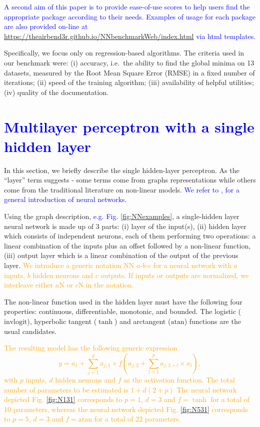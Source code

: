 \textcolor{blue}{A second aim of this paper is to
provide ease-of-use scores to help users find the
appropriate package according to their needs. 
Examples of usage for each package are also provided
on-line at \url{https://theairbend3r.github.io/NNbenchmarkWeb/index.html}
via html templates.}

Specifically, we focus only on regression-based algorithms. The criteria
used in our benchmark were: (i) accuracy, i.e.~the ability to find the
global minima on 13 datasets, measured by the Root Mean Square Error
(RMSE) in a fixed number of iterations; (ii) speed of the training
algorithm; (iii) availability of helpful utilities; (iv) quality of the
documentation.

\hypertarget{section}{%
\section{\texorpdfstring{\textcolor{blue}{Multilayer perceptron with a single hidden layer}}{}}\label{section}}

In this section, we briefly describe the single hidden-layer perceptron.
As the ``layer'' term suggests - some terms come from graphs
representations while others come from the traditional literature on
non-linear models. \textcolor{blue}{
We refer to \citep[Chapter 11]{friedman2001elements}, 
\citep[Chapter 10]{izenman2008modern}
\citep{ripley2007pattern} for a general introduction 
of neural networks.}

Using the graph description,
\textcolor{blue}{e.g. Fig. \ref{fig:NNexamples}}, a single-hidden layer
neural network is made up of 3 parts: (i) layer of the input(s), (ii)
hidden layer which consists of independent neurons, each of them
performing two operations: a linear combination of the inputs plus an
offset followed by a non-linear function, (iii) output layer which is a
linear combination of the output of the previous layer.
\textcolor{orange}{We introduce a generic notation NN $a$-$b$-$c$ for a neural network
with $a$ inputs, $b$ hidden neurons and $c$ outputs. If inputs or outputs
are normalized, we interleave either $a$N or $c$N in the notation.}

The non-linear function used in the hidden layer must have the following
four properties: continuous, differentiable, monotonic, and bounded. The
logistic (\(\text{invlogit}\)), hyperbolic tangent (\(\tanh\)) and
arctangent (\(\text{atan}\)) functions are the usual candidates.

\textcolor{orange}{
The resulting model has the following generic expression 
$$
y = a_1 + \sum_{j=1}^d a_{j,1} \times f(a_{j,2}+\sum_{l=1}^p a_{j,2+l}\times x_l),
$$
with $p$ inputs, $d$ hidden neurons and $f$ as the activation function.
The total number of parameters to be estimated is $1+d(2+p)$
The neural network depicted Fig. \ref{fig:N131} corresponds to $p=1$, $d=3$ and $f=\tanh$
for a total of 10 parameters,
whereas the neural network depicted Fig. \ref{fig:N531} corresponds to $p=5$, $d=3$ and $f=\text{atan}$
for a total of 22 parameters.}

